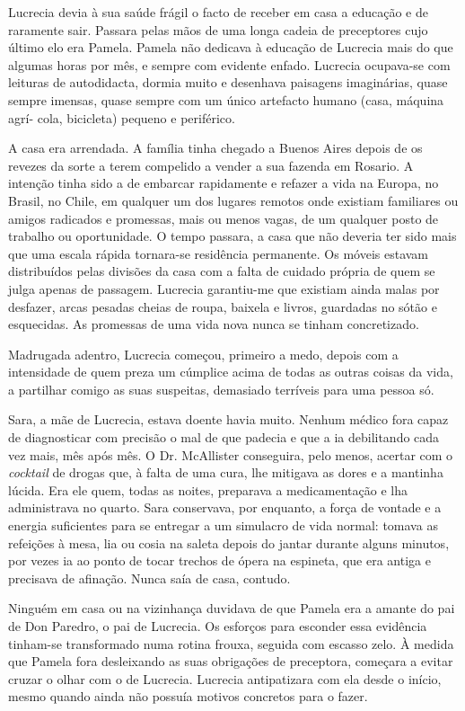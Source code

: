 Lucrecia devia à sua saúde frágil o facto de receber em casa a educação
e de raramente sair. Passara pelas mãos de uma longa cadeia de
preceptores cujo último elo era Pamela. Pamela não dedicava à educação
de Lucrecia mais do que algumas horas por mês, e sempre com evidente
enfado. Lucrecia ocupava-se com leituras de autodidacta, dormia muito e
desenhava paisagens imaginárias, quase sempre imensas, quase sempre
com um único artefacto humano (casa, máquina agrí- cola, bicicleta)
pequeno e periférico.

A casa era arrendada. A família tinha chegado a Buenos Aires depois de
os revezes da sorte a terem compelido a vender a sua fazenda em Rosario.
A intenção tinha sido a de embarcar rapidamente e refazer a vida na
Europa, no Brasil, no Chile, em qualquer um dos lugares remotos onde
existiam familiares ou amigos radicados e promessas, mais ou menos
vagas, de um qualquer posto de trabalho ou oportunidade. O tempo passara, a casa que não deveria ter sido mais que uma escala rápida
tornara-se residência permanente. Os móveis estavam distribuídos pelas
divisões da casa com a falta de cuidado própria de quem se julga apenas
de passagem. Lucrecia garantiu-me que existiam ainda malas por desfazer,
arcas pesadas cheias de roupa, baixela e livros, guardadas no sótão e
esquecidas. As promessas de uma vida nova nunca se tinham concretizado.

Madrugada adentro, Lucrecia começou, primeiro a medo, depois com a
intensidade de quem preza um cúmplice acima
de todas as outras coisas da vida, a partilhar comigo as suas suspeitas,
demasiado terríveis para uma pessoa só.

Sara, a mãe de Lucrecia, estava doente havia muito. Nenhum médico fora
capaz de diagnosticar com precisão o mal de que padecia e que a ia
debilitando cada vez mais, mês após mês. O Dr. McAllister conseguira,
pelo menos, acertar com o \emph{cocktail }de drogas que, à falta de uma
cura, lhe mitigava as dores e a mantinha lúcida. Era ele quem, todas as
noites, preparava a medicamentação e lha administrava no quarto. Sara
conservava, por enquanto, a força de vontade e a energia suficientes
para se entregar a um simulacro de vida normal: tomava as refeições à
mesa, lia ou cosia na saleta depois do jantar durante alguns minutos,
por vezes ia ao ponto de tocar trechos de ópera na espineta, que era
antiga e precisava de afinação. Nunca saía de casa, contudo.

Ninguém em casa ou na vizinhança duvidava de que Pamela era a amante do
pai de Don Paredro, o pai de Lucrecia. Os esforços para esconder essa
evidência tinham-se transformado numa rotina frouxa, seguida com escasso
zelo. À medida que Pamela fora desleixando as suas obrigações de
preceptora, começara a evitar cruzar o olhar com o de Lucrecia.
Lucrecia antipatizara com ela desde o início, mesmo quando ainda não
possuía motivos concretos para o fazer.

